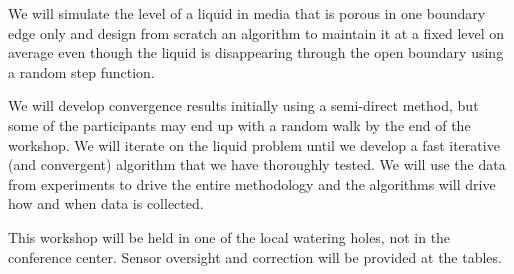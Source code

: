 \documentclass{report}
\begin{document}
We will simulate the level of a liquid in media that is porous in one
boundary edge only and design from scratch an algorithm to maintain it at
a fixed level on average even though the liquid is disappearing through
the open boundary using a random step function.

We will develop convergence results initially using a semi-direct method,
but some of the participants may end up with a random walk by the end of
the workshop. We will iterate on the liquid problem until we develop a
fast iterative (and convergent) algorithm that we have thoroughly tested.
We will use the data from experiments to drive the entire methodology and
the algorithms will drive how and when data is collected.

This workshop will be held in one of the local watering holes, not in the
conference center. Sensor oversight and correction will be provided at
the tables.
\end{document}
